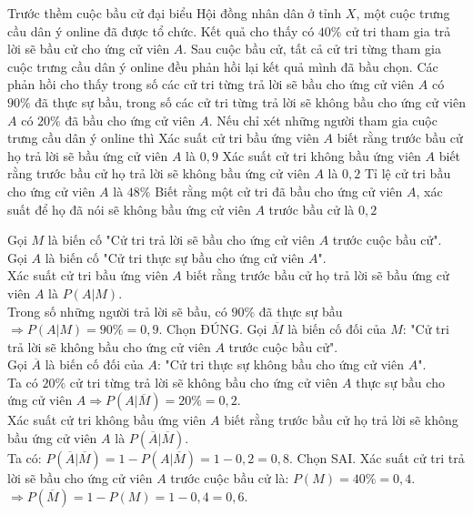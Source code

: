 \begin{ex} %
	Trước thềm cuộc bầu cử đại biểu Hội đồng nhân dân ở tỉnh $X$, một cuộc trưng cầu dân ý online đã được tổ chức. Kết quả cho thấy có $40\%$ cử tri tham gia trả lời sẽ bầu cử cho ứng cử viên $A$. Sau cuộc bầu cử, tất cả cử tri từng tham gia cuộc trưng cầu dân ý online đều phản hồi lại kết quả mình đã bầu chọn. Các phản hồi cho thấy trong số các cử tri từng trả lời sẽ bầu cho ứng cử viên $A$ có $90\%$ đã thực sự bầu, trong số các cử tri từng trả lời sẽ không bầu cho ứng cử viên $A$ có $20\%$ đã bầu cho ứng cử viên $A$. Nếu chỉ xét những người tham gia cuộc trưng cầu dân ý online thì
	\choiceTF
	{\True Xác suất cử tri bầu ứng viên $A$ biết rằng trước bầu cử họ trả lời sẽ bầu ứng cử viên $A$ là $0{,}9$}
	{Xác suất cử tri không bầu ứng viên $A$ biết rằng trước bầu cử họ trả lời sẽ không bầu ứng cử viên $A$ là $0{,}2$}
	{\True Tỉ lệ cử tri bầu cho ứng cử viên $A$ là $48\%$}
	{Biết rằng một cử tri đã bầu cho ứng cử viên $A$, xác suất để họ đã nói sẽ không bầu ứng cử viên $A$ trước bầu cử là $0{,}2$}
	\loigiai
	{
		\begin{itemchoice}
			\itemch Gọi $M$ là biến cố "Cử tri trả lời sẽ bầu cho ứng cử viên $A$ trước cuộc bầu cử".\\
			Gọi $A$ là biến cố "Cử tri thực sự bầu cho ứng cử viên $A$".\\
			Xác suất cử tri bầu ứng viên $A$ biết rằng trước bầu cử họ trả lời sẽ bầu ứng cử viên $A$ là $P(A|M)$.\\
			Trong số những người trả lời sẽ bầu, có $90\%$ đã thực sự bầu $\Rightarrow P(A|M) = 90\% = 0{,}9$. Chọn ĐÚNG.
			\itemch Gọi $\overline{M}$ là biến cố đối của $M$: "Cử tri trả lời sẽ không bầu cho ứng cử viên $A$ trước cuộc bầu cử".\\
			Gọi $\overline{A}$ là biến cố đối của $A$: "Cử tri thực sự không bầu cho ứng cử viên $A$".\\
			Ta có $20\%$ cử tri từng trả lời sẽ không bầu cho ứng cử viên $A$ thực sự bầu cho ứng cử viên $A \Rightarrow P(A|\overline{M}) = 20\% = 0{,}2$.\\
			Xác suất cử tri không bầu ứng viên $A$ biết rằng trước bầu cử họ trả lời sẽ không bầu ứng cử viên $A$ là $P(\overline{A}|\overline{M})$.\\
			Ta có: $P(\overline{A}|\overline{M}) = 1 - P(A|\overline{M}) = 1 - 0{,}2 = 0{,}8$. Chọn SAI.
			\itemch Xác suất cử tri trả lời sẽ bầu cho ứng cử viên $A$ trước cuộc bầu cử là: $P(M) = 40\% = 0{,}4$.\\
			$\Rightarrow P(\overline{M}) = 1 - P(M) = 1 - 0{,}4 = 0{,}6$.\\

\end{itemchoice}}
\end{ex}

